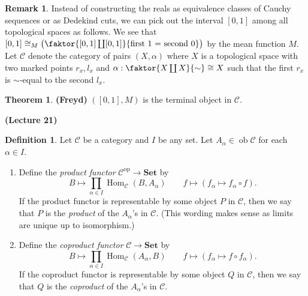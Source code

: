 \documentclass[10pt,letterpaper,cm]{nupset}
\theoremstyle{definition}
\newtheorem*{definition}{Definition}
\newtheorem{remark}{Remark}
\newtheorem{theorem}{Theorem}
\newcommand{\1}{\mathbf{1}}
\renewcommand{\c}{\mathscr{C}}
\newcommand{\0}{\vec 0}
\DeclareMathOperator{\op}{op}
\DeclareMathOperator{\ob}{ob}
\DeclareMathOperator{\Hom}{Hom}
\begin{document}
\begin{remark}
 Instead of constructing the reals as equivalence classes of Cauchy sequences or as Dedekind cuts, we can pick out the interval $[0,1]$ among all topological spaces as follows. We see that $[0,1]\cong_M \big ( \faktor{[0,1] \coprod [0,1]}{\text{first 1 = second 0}} \big )$ by the mean function $M$. Let $\c$ denote the category of pairs $(X, \alpha)$ where $X$ is a topological space with two marked points $r_x, l_x$ and $\alpha :  \faktor{X \coprod X}{\sim} \cong X$ such that the first $r_x$ is $\sim$-equal to the second $l_x$.
\begin{theorem}{\textbf{(Freyd)}}
$([0,1], M)$ is the terminal object in $\c$.
\end{theorem}
\end{remark}

\begin{center}
{\textbf{(Lecture 21)}}
\end{center}

\begin{definition} Let $\c$ be a category and $I$ be any set. Let $A_{\alpha} \in \ob \c$ for each $\alpha \in I$.
\begin{enumerate}
\item  Define the \textit{product functor} $\c^{\op} \to \mathbf{Set}$ by $$B \mapsto \prod_{\alpha \in I}\Hom_{\c}(B, A_{\alpha}) \quad \quad f \mapsto (f_{\alpha} \mapsto f_{\alpha} \circ f).$$ If the product functor is representable by some object $P$ in $\c$, then we say that $P$ is the \textit{product} of the $A_{\alpha}$'s in $\c$. (This wording makes sense as limits are unique up to isomorphism.)
\item Define the \textit{coproduct functor} $\c \to \mathbf{Set}$ by $$ B \mapsto \prod_{\alpha \in I} \Hom_{\c}(A_{\alpha}, B) \quad \quad f \mapsto (f_{\alpha} \mapsto f \circ f_{\alpha}).$$ If the coproduct functor is representable by some object $Q$ in $\c$, then we say that $Q$ is the \textit{coproduct} of the $A_{\alpha}$'s in $\c$.
\end{enumerate}
\end{definition}
\end{document}
